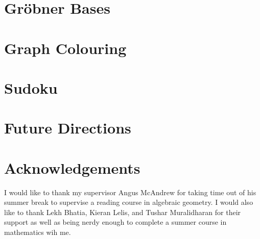 \documentclass[11pt]{article}
\theoremstyle{definition}
\begin{document}
    \section{Gr\"obner Bases}

    



    \section{Graph Colouring}
    
    

        
        
    \section{Sudoku}

    

    \section{Future Directions}
    
    

    \section*{Acknowledgements}
    I would like to thank my supervisor Angus McAndrew for taking time out of his summer break to supervise a reading course in algebraic geometry. I would also like to thank Lekh Bhatia, Kieran Lelis, and Tushar Muralidharan for their support as well as being nerdy enough to complete a summer course in mathematics wih me.
    \pagebreak

    
    
\end{document}
